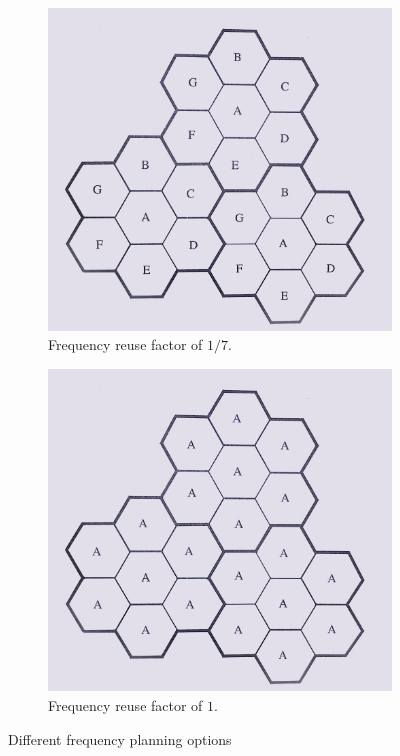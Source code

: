 \begin{figure}[t]
    \centering
    \begin{subfigure}[b]{0.45\textwidth}
        \includegraphics[width=\textwidth]{./ch1/img/frequency_reuse.png}
        \caption{Frequency reuse factor of $1 / 7$.}
        \label{fig:freuse}
    \end{subfigure}
    \begin{subfigure}[b]{0.45\textwidth}
        \includegraphics[width=\textwidth]{./ch1/img/universal_freq_reuse.png}
        \caption{Frequency reuse factor of $1$.}
        \label{fig:ufreuse}
    \end{subfigure}
    \caption{Different frequency planning options}
\end{figure}

